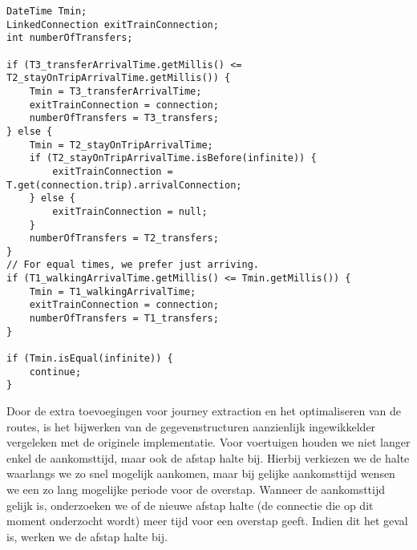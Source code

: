 \begin{code}
\begin{verbatim}
DateTime Tmin;
LinkedConnection exitTrainConnection;
int numberOfTransfers;

if (T3_transferArrivalTime.getMillis() <= T2_stayOnTripArrivalTime.getMillis()) {
	Tmin = T3_transferArrivalTime;
	exitTrainConnection = connection;
	numberOfTransfers = T3_transfers;
} else {
	Tmin = T2_stayOnTripArrivalTime;
	if (T2_stayOnTripArrivalTime.isBefore(infinite)) {
		exitTrainConnection = T.get(connection.trip).arrivalConnection;
	} else {
		exitTrainConnection = null;
	}
	numberOfTransfers = T2_transfers;
}
// For equal times, we prefer just arriving.
if (T1_walkingArrivalTime.getMillis() <= Tmin.getMillis()) {
	Tmin = T1_walkingArrivalTime;
	exitTrainConnection = connection;
	numberOfTransfers = T1_transfers;
}

if (Tmin.isEqual(infinite)) {
	continue;
}
		\end{verbatim}
\end{code}
Door de extra toevoegingen voor journey extraction en het optimaliseren van de routes, is het bijwerken van de gegevenstructuren aanzienlijk ingewikkelder vergeleken met de originele implementatie. Voor voertuigen houden we niet langer enkel de aankomsttijd, maar ook de afstap halte bij. Hierbij verkiezen we de halte waarlangs we zo snel mogelijk aankomen, maar bij gelijke aankomsttijd wensen we een zo lang mogelijke periode voor de overstap. Wanneer de aankomsttijd gelijk is, onderzoeken we of de nieuwe afstap halte (de connectie die op dit moment onderzocht wordt) meer tijd voor een overstap geeft. Indien dit het geval is, werken we de afstap halte bij.
